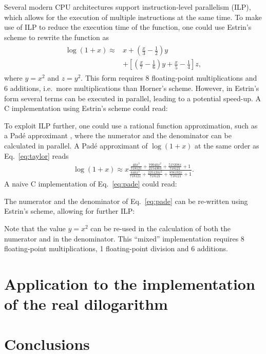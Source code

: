 \documentclass[10pt,DIV16,twocolumn]{scrartcl}
\begin{document}
Several modern CPU architectures support instruction-level parallelism
(ILP), which allows for the execution of multiple instructions at the
same time.  To make use of ILP to reduce the execution time of the
function, one could use Estrin's scheme \cite{estrin} to rewrite the
function as
%
\begin{align}
\begin{split}
  \log(1+x) \approx{}& x + \left(\frac{x}{3}-\frac{1}{2}\right)
    y \\ &+\left[\left(\frac{x}{7}-\frac{1}{6}\right)
    y+\frac{x}{5}-\frac{1}{4}\right] z,
\end{split}\label{eq:estrin}%
\end{align}
%
where $y=x^2$ and $z=y^2$.  This form requires 8 floating-point
multiplications and 6 additions, i.e.\ more multiplications than
Horner's scheme.  However, in Estrin's form several terms can be
executed in parallel, leading to a potential speed-up.  A C
implementation using Estrin's scheme could read:
%


To exploit ILP further, one could use a rational function
approximation, such as a Padé approximant \cite{pade}, where the
numerator and the denominator can be calculated in parallel.  A Padé
approximant of $\log(1+x)$ at the same order as Eq.~\eqref{eq:taylor}
reads
%
\begin{align}
  \log(1+x) \approx x
  \frac{\frac{40 x^3}{718121}+\frac{79040 x^2}{2154363}+\frac{517208
    x}{718121}+1}{\frac{640 x^3}{718121}+\frac{225120 x^2}{718121}+\frac{876192
    x}{718121}+1}.
  \label{eq:pade}
\end{align}
%
A naive C implementation of Eq.~\eqref{eq:pade} could read:
%

%
The numerator and the denominator of Eq.~\eqref{eq:pade} can be
re-written using Estrin's scheme, allowing for further ILP:
%

%
Note that the value $y=x^2$ can be re-used in the calculation of both
the numerator and in the denominator.  This ``mixed'' implementation
requires 8 floating-point multiplications, 1 floating-point division
and 6 additions.

\section{Application to the implementation of the real dilogarithm}

\section{Conclusions}



\end{document}
